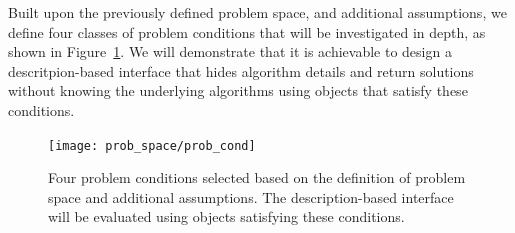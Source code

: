 Built upon the previously defined problem space, and additional assumptions, we define four classes of problem conditions that will be investigated in depth, as shown in Figure~\ref{fig:prob_cond}. We will demonstrate that it is achievable to design a descritpion-based interface that hides algorithm details and return solutions without knowing the underlying algorithms using objects that satisfy these conditions.
\begin{figure}[!htbp]
\centering
\texttt{[image: prob\_space/prob\_cond]}
\caption{Four problem conditions selected based on the definition of problem space and additional assumptions. The description-based interface will be evaluated using objects satisfying these conditions.}
\label{fig:prob_cond}
\end{figure}